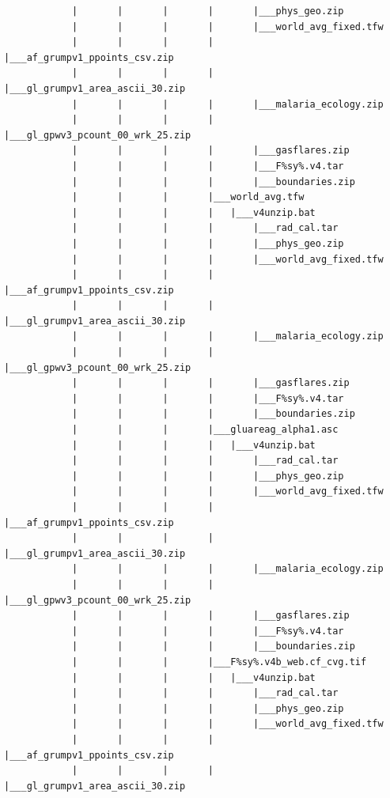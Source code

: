 \documentclass[]{book}
\begin{document}
\begin{verbatim}
            |       |       |       |       |___phys_geo.zip
            |       |       |       |       |___world_avg_fixed.tfw
            |       |       |       |       |___af_grumpv1_ppoints_csv.zip
            |       |       |       |       |___gl_grumpv1_area_ascii_30.zip
            |       |       |       |       |___malaria_ecology.zip
            |       |       |       |       |___gl_gpwv3_pcount_00_wrk_25.zip
            |       |       |       |       |___gasflares.zip
            |       |       |       |       |___F%sy%.v4.tar
            |       |       |       |       |___boundaries.zip
            |       |       |       |___world_avg.tfw
            |       |       |       |   |___v4unzip.bat
            |       |       |       |       |___rad_cal.tar
            |       |       |       |       |___phys_geo.zip
            |       |       |       |       |___world_avg_fixed.tfw
            |       |       |       |       |___af_grumpv1_ppoints_csv.zip
            |       |       |       |       |___gl_grumpv1_area_ascii_30.zip
            |       |       |       |       |___malaria_ecology.zip
            |       |       |       |       |___gl_gpwv3_pcount_00_wrk_25.zip
            |       |       |       |       |___gasflares.zip
            |       |       |       |       |___F%sy%.v4.tar
            |       |       |       |       |___boundaries.zip
            |       |       |       |___gluareag_alpha1.asc
            |       |       |       |   |___v4unzip.bat
            |       |       |       |       |___rad_cal.tar
            |       |       |       |       |___phys_geo.zip
            |       |       |       |       |___world_avg_fixed.tfw
            |       |       |       |       |___af_grumpv1_ppoints_csv.zip
            |       |       |       |       |___gl_grumpv1_area_ascii_30.zip
            |       |       |       |       |___malaria_ecology.zip
            |       |       |       |       |___gl_gpwv3_pcount_00_wrk_25.zip
            |       |       |       |       |___gasflares.zip
            |       |       |       |       |___F%sy%.v4.tar
            |       |       |       |       |___boundaries.zip
            |       |       |       |___F%sy%.v4b_web.cf_cvg.tif
            |       |       |       |   |___v4unzip.bat
            |       |       |       |       |___rad_cal.tar
            |       |       |       |       |___phys_geo.zip
            |       |       |       |       |___world_avg_fixed.tfw
            |       |       |       |       |___af_grumpv1_ppoints_csv.zip
            |       |       |       |       |___gl_grumpv1_area_ascii_30.zip

\end{verbatim}
\end{document}
